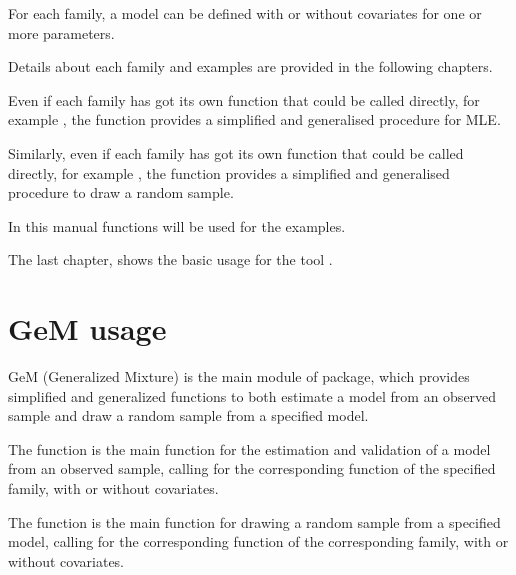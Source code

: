 \documentclass[letterpaper,10pt,english]{sphinxmanual}
\begin{document}
\sphinxAtStartPar
For each family, a model can be defined with or without covariates for one or more parameters.

\sphinxAtStartPar
Details about each family and examples are provided in the following chapters.

\sphinxAtStartPar
Even if each family has got its own  function  that
could be called directly, for example , the function  provides a
simplified and generalised procedure for MLE.

\sphinxAtStartPar
Similarly, even if each family has got its own  function  that
could be called directly, for example , the function  provides a
simplified and generalised procedure to draw a random sample.

\sphinxAtStartPar
In this manual  functions will be used for the examples.

\sphinxAtStartPar
The last chapter, shows the basic usage for the tool .


\section{GeM usage}
\label{\detokenize{manual:gem-usage}}\label{\detokenize{manual:gem-manual}}
\sphinxAtStartPar
GeM (Generalized Mixture) is the main module of  package, which provides simplified and
generalized functions to both estimate a model from an observed sample and draw a random sample from a
specified model.

\sphinxAtStartPar
The function  is the main function for the estimation and
validation of a model from an observed sample, calling for the corresponding  function of
the specified family, with or without covariates.

\sphinxAtStartPar
The function  is the main function for drawing a random sample from a specified model,
calling for the corresponding  function of the corresponding family,
with or without covariates.

\sphinxAtStartPar
{}
\end{document}
